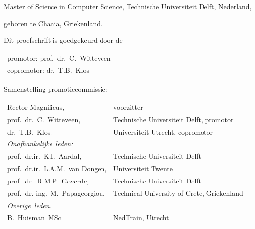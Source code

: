 \begin{titlepage}
\begin{center}
\bigskip
\bigskip

Master of Science in Computer Science, Technische Universiteit Delft, Nederland,


geboren te Chania, Griekenland.

\vspace*{2\bigskipamount}

\end{center}

\clearpage
\thispagestyle{empty}

\noindent Dit proefschrift is goedgekeurd door de

\medskip\noindent
\begin{tabular}{l}
    promotor: prof.\ dr.\ C.\ Witteveen \\
    copromotor: dr.\ T.B.\ Klos
\end{tabular}

\bigskip
\noindent Samenstelling promotiecommissie:

\medskip\noindent

\begin{tabular}{p{4.5cm}l}
    Rector Magnificus, & voorzitter \\
	 prof.\ dr.\ C.\ Witteveen, & Technische Universiteit Delft, promotor \\
    dr.\ T.B.\ Klos, & Universiteit Utrecht, copromotor \\

    \medskip
    \mbox{\emph{Onafhankelijke leden:}} & \\

    prof.\ dr.ir.\ K.I.\ Aardal, & Technische Universiteit Delft \\
	 prof.\ dr.ir.\ L.A.M.\ van Dongen, & Universiteit Twente \\
	 prof.\ dr.\ R.M.P.\ Goverde, & Technische Universiteit Delft \\
	 prof.\ dr.-ing.\ M.\ Papageorgiou,  & Technical University of Crete, Griekenland \\

    \medskip
    \mbox{\emph{Overige leden:}} & \\
    B.\ Huisman\ MSc & NedTrain, Utrecht \\
\end{tabular}


\end{titlepage}

